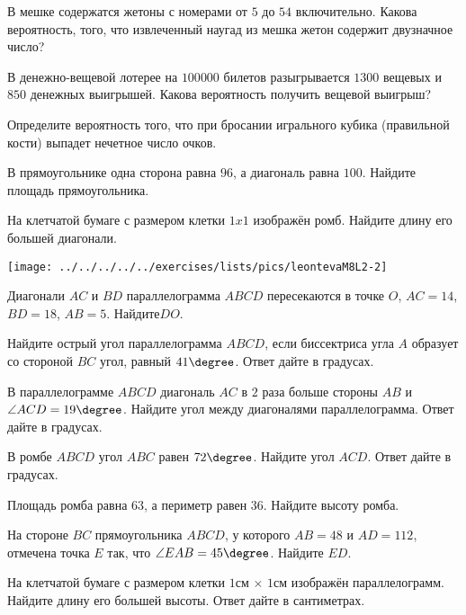 \begin{class}[number=3]
	\begin{listofex}
		 \item В мешке содержатся жетоны с номерами от \( 5 \) до \( 54 \) включительно. Какова вероятность, того, что извлеченный наугад из мешка жетон содержит двузначное число?
		\item В денежно-вещевой лотерее на \( 100 000 \) билетов разыгрывается \( 1300 \) вещевых и \( 850 \) денежных выигрышей. Какова вероятность получить вещевой выигрыш?
		\item Определите вероятность того, что при бросании игрального кубика (правильной кости) выпадет нечетное число очков.
		
		\item В прямоугольнике одна сторона равна \( 96 \), а диагональ равна \( 100 \). Найдите площадь прямоугольника.
		\item 
		\begin{minipage}[t]{\bodywidth}
			На клетчатой бумаге с размером клетки \( 1x1 \) изображён ромб. Найдите длину его большей диагонали.
		\end{minipage}
		\hspace{0.02\linewidth}
		\begin{minipage}[t]{\picwidth}
			\texttt{[image: ../../../../../exercises/lists/pics/leontevaM8L2-2]}
		\end{minipage}
		\item Диагонали \( AC \) и \( BD \) параллелограмма \( ABCD \) пересекаются в точке \( O \), \( AC  =  14 \), \( BD  =  18 \), \( AB  =  5 \). Найдите\(  DO \).
		\item Найдите острый угол параллелограмма \( ABCD \), если биссектриса угла \( A \) образует со стороной \( BC \) угол, равный \( 41\degree \). Ответ дайте в градусах.
		\item В параллелограмме \( ABCD \) диагональ \( AC \) в \( 2 \) раза больше стороны \( AB \) и \( \angle ACD=19\degree \). Найдите угол между диагоналями параллелограмма. Ответ дайте в градусах.
		\item В ромбе \( ABCD \) угол \( ABC \) равен \( 72\degree \). Найдите угол \( ACD \). Ответ дайте в градусах.
		\item Площадь ромба равна \( 63 \), а периметр равен \( 36 \). Найдите высоту ромба.
		\item На стороне \( BC \) прямоугольника \( ABCD \), у которого \( AB = 48 \) и \( AD = 112 \), отмечена точка \(  E \) так, что \( \angle EAB = 45\degree \). Найдите \( ED \).
		\item На клетчатой бумаге с размером клетки \( 1 \)см \( × \) \( 1 \)см изображён параллелограмм. Найдите длину его большей высоты. Ответ дайте в сантиметрах. 
	\end{listofex}
\end{class}

